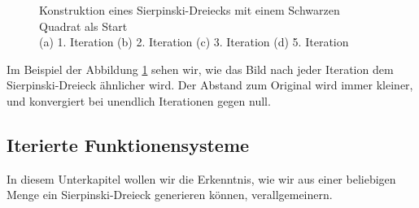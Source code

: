 \begin{figure}	
	\centering
	\caption{Konstruktion eines Sierpinski-Dreiecks mit einem Schwarzen Quadrat als Start\\
		(a) 1. Iteration (b) 2. Iteration (c) 3. Iteration (d) 5. Iteration}
	\label{ifs:sierpconst}
\end{figure}
Im Beispiel der Abbildung \ref{ifs:sierpconst} sehen wir, wie das Bild nach jeder Iteration dem Sierpinski-Dreieck ähnlicher wird.
Der Abstand zum Original wird immer kleiner, und konvergiert bei unendlich Iterationen gegen null.

\subsection{Iterierte Funktionensysteme
\label{ifs:subsection:bonorum}}
In diesem Unterkapitel wollen wir die Erkenntnis, wie wir aus einer beliebigen Menge ein Sierpinski-Dreieck generieren können, verallgemeinern.


